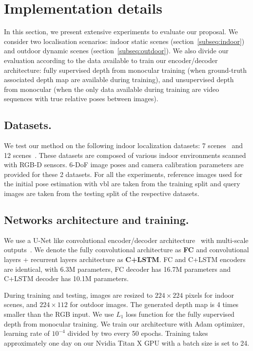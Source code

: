 \section{Implementation details}
\label{sec:implementation}
In this section, we present extensive experiments to evaluate our proposal. We consider two localisation scenarios: indoor static scenes (section~\ref{subseq:indoor}) and outdoor dynamic scenes (section~\ref{subseq:outdoor}). We also divide our evaluation according to the data available to train our encoder/decoder architecture: fully supervised depth from monocular training (when ground-truth associated depth map are available during training), and unsupervised depth from monocular (when the only data available during training are video sequences with true relative poses between images).

\subsection{Datasets.} We test our method on the following indoor localization datasets: 7 scenes~\citep{Shotton2013} and 12 scenes~\citep{Valentin2016}. These datasets are composed of various indoor environments scanned with RGB-D sensors.  6-DoF image poses and camera calibration parameters are provided for these 2 datasets. For all the experiments, reference images used for the initial pose estimation with \ac{vbl} are taken from the training split and query images are taken from the testing split of the respective datasets.

\subsection{Networks architecture and training.} We use a U-Net like convolutional encoder/decoder architecture~\citep{Isola2017} with multi-scale outputs~\citep{Godard2017}. We denote the fully convolutional architecture as \textbf{FC} and convolutional layers + recurrent layers architecture as \textbf{C+LSTM}. FC and C+LSTM encoders are identical, with 6.3M parameters, FC decoder has 16.7M parameters and C+LSTM decoder has 10.1M parameters.

During training and testing, images are resized to $224 \times 224$ pixels for indoor scenes, and $224 \times 112$ for outdoor images. The generated depth map is 4 times smaller than the RGB input. We use $L_1$ loss function for the fully supervised depth from monocular training. We train our architecture with Adam optimizer, learning rate of $10^{-4}$ divided by two every 50 epochs. Training takes approximately one day on our Nvidia Titan X GPU with a batch size is set to 24.

